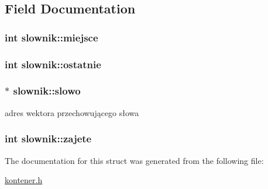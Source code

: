 \subsection{Field Documentation}
\hypertarget{structslownik_a12ee12fe22eea3f9feb644249488cabb}{}
\subsubsection[{miejsce}]{\setlength{\rightskip}{0pt plus 5cm}int slownik\+::miejsce}\label{structslownik_a12ee12fe22eea3f9feb644249488cabb}
\hypertarget{structslownik_a40c60cac651b33052c12dc30918aa840}{}
\subsubsection[{ostatnie}]{\setlength{\rightskip}{0pt plus 5cm}int slownik\+::ostatnie}\label{structslownik_a40c60cac651b33052c12dc30918aa840}
\hypertarget{structslownik_a512b20a3761955c3939b569f00f93716}{}
\subsubsection[{slowo}]{$\ast$ slownik\+::slowo}\label{structslownik_a512b20a3761955c3939b569f00f93716}


adres wektora przechowującego słowa 

\hypertarget{structslownik_ad96661a61ac1dac1419dc121cfb8d565}{}
\subsubsection[{zajete}]{\setlength{\rightskip}{0pt plus 5cm}int slownik\+::zajete}\label{structslownik_ad96661a61ac1dac1419dc121cfb8d565}


The documentation for this struct was generated from the following file\+:\begin{DoxyCompactItemize}
\item 
\hyperlink{kontener_8h}{kontener.\+h}\end{DoxyCompactItemize}
